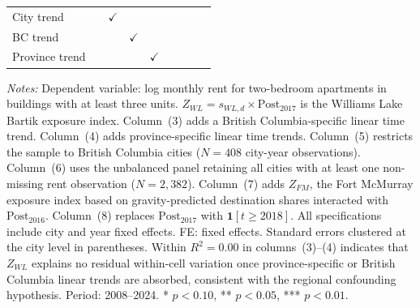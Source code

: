 \documentclass[12pt]{article}
\begin{document}
\begin{landscape}
\begin{table}[htbp]
\begin{threeparttable}
\begin{tabular}{lrrrrrrrr}
      City trend     &              & $\checkmark$  &              &              &          &               &               &               \\
      BC trend       &              &               & $\checkmark$ &              &          &               &               &               \\
      Province trend &              &               &              & $\checkmark$ &          &               &               &               \\
      \bottomrule
    \end{tabular}
    \begin{tablenotes}[flushleft]\footnotesize
      \item \textit{Notes:} Dependent variable: log monthly rent for
        two-bedroom apartments in buildings with at least three units.
        $Z_{WL}=s_{WL,d}\times\mathrm{Post}_{2017}$ is the Williams Lake
        Bartik exposure index. Column~(3) adds a British Columbia-specific linear time
        trend. Column~(4) adds province-specific linear time trends.
        Column~(5) restricts the sample to British Columbia cities
        ($N=408$ city-year observations). Column~(6) uses the unbalanced
        panel retaining all cities with at least one non-missing rent
        observation ($N=2{,}382$). Column~(7) adds $Z_{FM}$, the Fort
        McMurray exposure index based on gravity-predicted destination shares
        interacted with $\mathrm{Post}_{2016}$. Column~(8) replaces
        $\mathrm{Post}_{2017}$ with $\mathbf{1}[t\geq 2018]$. All
        specifications include city and year fixed effects. FE: fixed effects.
        Standard errors clustered at the city level in parentheses.
        Within $R^{2}=0.00$ in columns~(3)--(4) indicates that $Z_{WL}$
        explains no residual within-cell variation once province-specific
        or British Columbia linear trends are absorbed, consistent with
        the regional confounding hypothesis.
        Period: 2008--2024.
        * $p < 0.10$, ** $p < 0.05$, *** $p < 0.01$.
    \end{tablenotes}
  \end{threeparttable}
\end{table}
\end{landscape}

\end{document}
